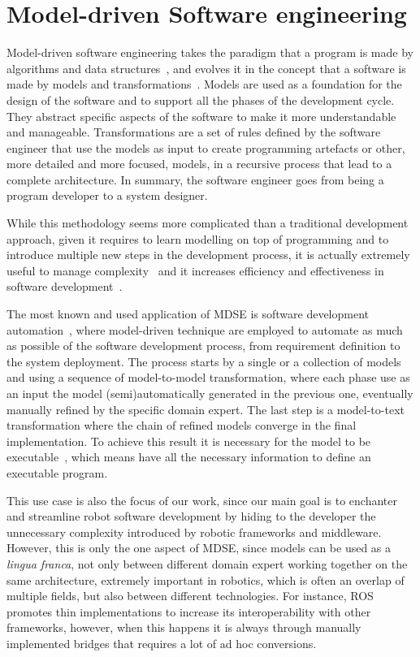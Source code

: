 \section{Model-driven Software engineering}
Model-driven software engineering takes the paradigm that a program is made by algorithms and data structures~\cite{wirth1986algorithms}, and evolves it in the concept that a software is made by models and transformations~\cite{brambilla2012model}. Models are used as a foundation for the design of the software and to support all the phases of the development cycle. They abstract specific aspects of the software to make it more understandable and manageable. Transformations are a set of rules defined by the software engineer that use the models as input to create programming artefacts or other, more detailed and more focused, models, in a recursive process that lead to a complete architecture. In summary, the software engineer goes from being a program developer to a system designer.

While this methodology seems more complicated than a traditional development approach, given it requires to learn modelling on top of programming and to introduce multiple new steps in the development process, it is actually extremely useful to manage complexity~\cite{selic2003pragmatics} and it increases efficiency and effectiveness in software development~\cite{acerbis2007developing}.

The most known and used application of MDSE is software development automation~\cite{sendall2003model}, where model-driven technique are employed to automate as much as possible of the software development process, from requirement definition to the system deployment. The process starts by a single or a collection of models and using a sequence of model-to-model transformation, where each phase use as an input the model (semi)automatically generated in the previous one, eventually manually refined by the specific domain expert. The last step is a model-to-text transformation where the chain of refined models converge in the final implementation. To achieve this result it is necessary for the model to be executable~\cite{mellor2002executable}, which means have all the necessary information to define an executable program.

This use case is also the focus of our work, since our main goal is to enchanter and streamline robot software development by hiding to the developer the unnecessary complexity introduced by robotic frameworks and middleware. However, this is only the one aspect of MDSE, since models can be used as a \textit{lingua franca}, not only between different domain expert working together on the same architecture, extremely important in robotics, which is often an overlap of multiple fields, but also between different technologies. For instance, ROS promotes thin implementations to increase its interoperability with other frameworks, however, when this happens it is always through manually implemented bridges that requires a lot of ad hoc conversions.

